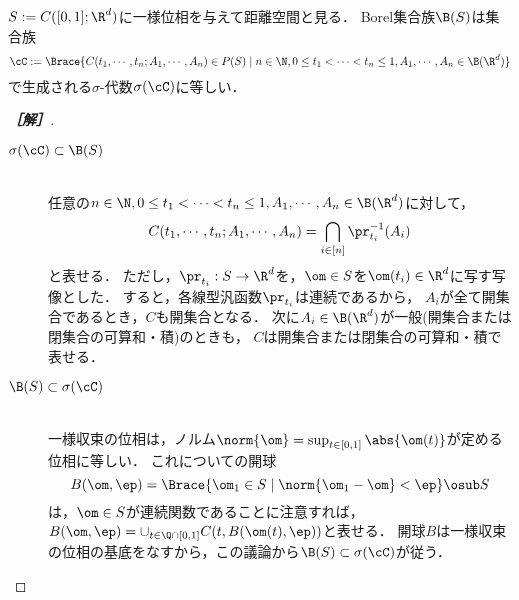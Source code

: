 \documentclass[uplatex,dvipdfmx]{jsarticle}
\begin{document}
\begin{problem*}[10]
    $S:=C([0,1];\R^d)$に一様位相を与えて距離空間と見る．
    Borel集合族$\B(S)$は集合族
    \[\cC:=\Brace{C(t_1,\cdots,t_n;A_1,\cdots,A_n)\in P(S)\mid n\in\N,0\le t_1<\cdots<t_n\le1,A_1,\cdots,A_n\in\B(\R^d)}\]
    で生成される$\sigma$-代数$\sigma(\cC)$に等しい．
\end{problem*}
\begin{proof}[\bf［解］]\mbox{}
    \begin{description}
        \item[$\sigma(\cC)\subset\B(S)$] \mbox{}\\任意の$n\in\N,0\le t_1<\cdots<t_n\le1,A_1,\cdots,A_n\in\B(\R^d)$に対して，
        \[C(t_1,\cdots,t_n; A_1,\cdots,A_n)=\bigcap_{i\in[n]}\pr_{t_i}^{-1}(A_i)\]
        と表せる．
        ただし，$\pr_{t_i}:S\to\R^d$を，$\om\in S$を$\om(t_i)\in\R^d$に写す写像とした．
        すると，各線型汎函数$\pr_{t_i}$は連続であるから，
        $A_i$が全て開集合であるとき，$C$も開集合となる．
        次に$A_i\in\B(\R^d)$が一般(開集合または閉集合の可算和・積)のときも，
        $C$は開集合または閉集合の可算和・積で表せる．
        \item[$\B(S)\subset\sigma(\cC)$] \mbox{}\\一様収束の位相は，ノルム$\norm{\om}=\sup_{t\in[0,1]}\abs{\om(t)}$が定める位相に等しい．
        これについての開球
        \[B(\om,\ep)=\Brace{\om_1\in S\mid\norm{\om_1-\om}<\ep}\osub S\]
        は，$\om\in S$が連続関数であることに注意すれば，
        $B(\om,\ep)=\cup_{t\in\Q\cap[0,1]}C(t,B(\om(t),\ep))$と表せる．
        開球$B$は一様収束の位相の基底をなすから，この議論から$\B(S)\subset\sigma(\cC)$が従う．
    \end{description}
\end{proof}
\end{document}
